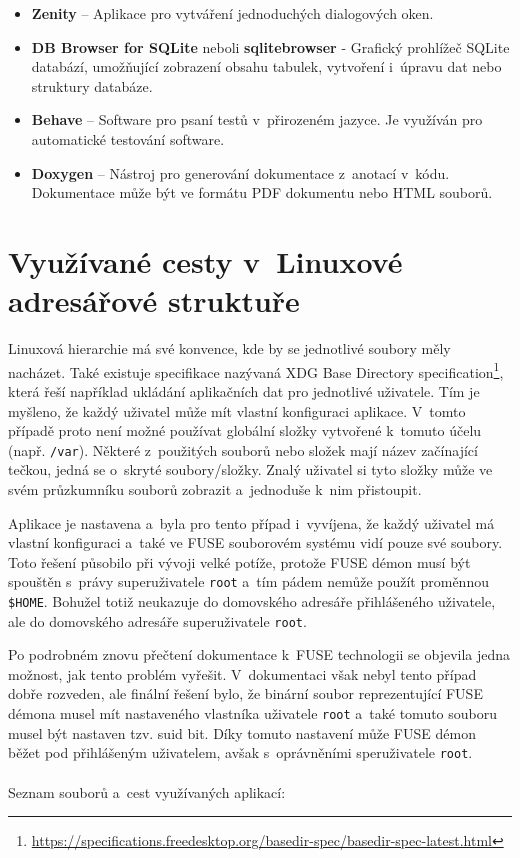 \begin{itemize}
    \item \textbf{Zenity} – Aplikace pro vytváření jednoduchých dialogových oken.
    \item \textbf{DB Browser for SQLite} neboli \textbf{sqlitebrowser} - Grafický prohlížeč SQLite databází, umožňující zobrazení obsahu tabulek, vytvoření i úpravu dat
    nebo struktury databáze.
    \item \textbf{Behave} – Software pro psaní testů v přirozeném jazyce. Je využíván pro automatické testování software.
    \item \textbf{Doxygen} – Nástroj pro generování dokumentace z anotací v kódu. Dokumentace může být ve formátu PDF dokumentu nebo HTML souborů.
\end{itemize}

\section{Využívané cesty v Linuxové adresářové struktuře}

Linuxová hierarchie má své konvence, kde by se jednotlivé soubory měly nacházet. Také existuje specifikace nazývaná XDG Base Directory specification\footnote{\url{https://specifications.freedesktop.org/basedir-spec/basedir-spec-latest.html}},
která řeší například ukládání aplikačních dat pro jednotlivé uživatele. Tím je myšleno, že každý uživatel může mít vlastní konfiguraci aplikace. V tomto případě proto není
možné používat globální složky vytvořené k tomuto účelu (např. \texttt{/var}). Některé z použitých souborů nebo složek mají název začínající tečkou, jedná se o skryté
soubory/složky. Znalý uživatel si tyto složky může ve svém průzkumníku souborů zobrazit a jednoduše k nim přistoupit.

Aplikace je nastavena a byla pro tento případ i vyvíjena, že každý uživatel má vlastní konfiguraci a také ve FUSE souborovém systému vidí pouze své soubory. Toto řešení
působilo při vývoji velké potíže, protože FUSE démon musí být spouštěn s právy superuživatele \texttt{root} a tím pádem nemůže použít proměnnou \texttt{\$HOME}. Bohužel 
totiž neukazuje do domovského adresáře přihlášeného uživatele, ale do domovského adresáře superuživatele \texttt{root}.

Po podrobném znovu přečtení dokumentace k FUSE technologii se objevila jedna možnost, jak tento problém vyřešit. V dokumentaci však nebyl tento případ dobře rozveden, ale 
finální řešení bylo, že binární soubor reprezentující FUSE démona musel mít nastaveného vlastníka uživatele \texttt{root} a také tomuto souboru musel být nastaven 
tzv. suid bit. Díky tomuto nastavení může FUSE démon běžet pod přihlášeným uživatelem, avšak s oprávněními speruživatele \texttt{root}.
\\\\
\noindent Seznam souborů a cest využívaných aplikací:

